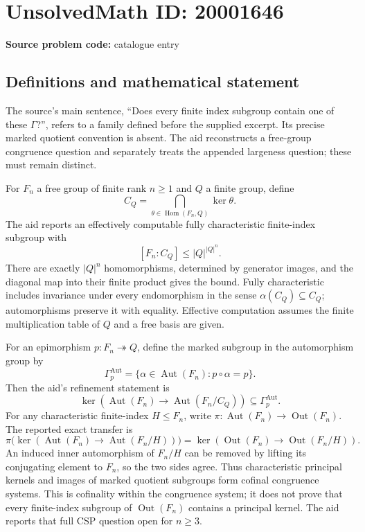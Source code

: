 \documentclass[11pt]{article}
\begin{document}
\section*{UnsolvedMath ID: 20001646}
\textbf{Source problem code:} catalogue entry
\subsection{Definitions and mathematical statement}
The source's main sentence, ``Does every finite index subgroup contain one of these \(\Gamma\)?'', refers to a family defined before the supplied excerpt. Its precise marked quotient convention is absent. The aid reconstructs a free-group congruence question and separately treats the appended largeness question; these must remain distinct.

For \(F_n\) a free group of finite rank \(n\geq1\) and \(Q\) a finite group, define
\[
 C_Q=\bigcap_{\theta\in\operatorname{Hom}(F_n,Q)}\ker\theta.
\]
The aid reports an effectively computable fully characteristic finite-index subgroup with
\[
 [F_n:C_Q]\leq|Q|^{|Q|^n}.
\]
There are exactly \(|Q|^n\) homomorphisms, determined by generator images, and the diagonal map into their finite product gives the bound. Fully characteristic includes invariance under every endomorphism in the sense \(\alpha(C_Q)\subseteq C_Q\); automorphisms preserve it with equality. Effective computation assumes the finite multiplication table of \(Q\) and a free basis are given.

For an epimorphism \(p:F_n\twoheadrightarrow Q\), define the marked subgroup in the automorphism group by
\[
 \Gamma_p^{\mathrm{Aut}}=\{\alpha\in\operatorname{Aut}(F_n):p\circ\alpha=p\}.
\]
Then the aid's refinement statement is
\[
 \ker(\operatorname{Aut}(F_n)\to\operatorname{Aut}(F_n/C_Q))
 \subseteq\Gamma_p^{\mathrm{Aut}}.
\]
For any characteristic finite-index \(H\leq F_n\), write \(\pi:\operatorname{Aut}(F_n)\to\operatorname{Out}(F_n)\). The reported exact transfer is
\[
 \pi\bigl(\ker(\operatorname{Aut}(F_n)\to\operatorname{Aut}(F_n/H))\bigr)
 =\ker(\operatorname{Out}(F_n)\to\operatorname{Out}(F_n/H)).
\]
An induced inner automorphism of \(F_n/H\) can be removed by lifting its conjugating element to \(F_n\), so the two sides agree. Thus characteristic principal kernels and images of marked quotient subgroups form cofinal congruence systems. This is cofinality within the congruence system; it does not prove that every finite-index subgroup of \(\operatorname{Out}(F_n)\) contains a principal kernel. The aid reports that full CSP question open for \(n\geq3\).
\end{document}
